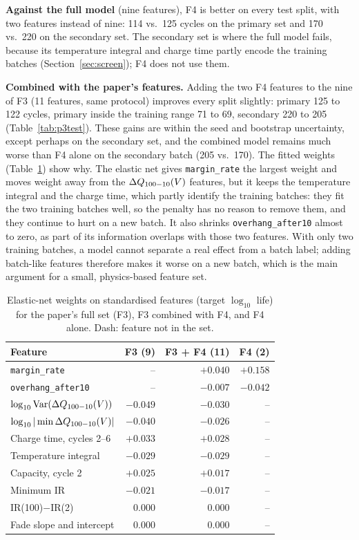 \textbf{Against the full model} (nine features), F4 is better on every test
split, with two features instead of nine: 114 vs.\ 125 cycles on the primary
set and 170 vs.\ 220 on the secondary set. The secondary set is where the
full model fails, because its temperature integral and charge time partly
encode the training batches (Section~\ref{sec:screen}); F4 does not use
them.

\textbf{Combined with the paper's features.} Adding the two F4 features to
the nine of F3 (11 features, same protocol) improves every split slightly:
primary 125 to 122 cycles, primary inside the training range 71 to 69,
secondary 220 to 205 (Table~\ref{tab:p3test}). These gains are within the
seed and bootstrap uncertainty, except perhaps on the secondary set, and the
combined model remains much worse than F4 alone on the secondary batch (205
vs.\ 170). The fitted weights (Table~\ref{tab:p3coef}) show why. The elastic
net gives \texttt{margin\_rate} the largest weight and moves weight away from
the $\Delta Q_{100-10}(V)$ features, but it keeps the temperature integral and the charge time,
which partly identify the training batches: they fit the two training batches
well, so the penalty has no reason to remove them, and they continue to hurt
on a new batch. It also shrinks \texttt{overhang\_after10} almost to zero, as
part of its information overlaps with those two features. With only two
training batches, a model cannot separate a real effect from a batch label;
adding batch-like features therefore makes it worse on a new batch, which is
the main argument for a small, physics-based feature set.

\begin{table}[t]
\centering
\caption{Elastic-net weights on standardised features (target
$\log_{10}$ life) for the paper's full set (F3), F3 combined with F4, and F4
alone. Dash: feature not in the set.}
\label{tab:p3coef}
\setlength{\tabcolsep}{4pt}
\begin{tabular}{@{}lrrr@{}}
\toprule
Feature & F3 (9) & F3 + F4 (11) & F4 (2) \\
\midrule
\texttt{margin\_rate} & -- & $+0.040$ & $+0.158$ \\
\texttt{overhang\_after10} & -- & $-0.007$ & $-0.042$ \\
$\log_{10}\mathrm{Var}(\Delta Q_{100-10}(V))$ & $-0.049$ & $-0.030$ & -- \\
$\log_{10}|\min\Delta Q_{100-10}(V)|$ & $-0.040$ & $-0.026$ & -- \\
Charge time, cycles 2--6 & $+0.033$ & $+0.028$ & -- \\
Temperature integral & $-0.029$ & $-0.029$ & -- \\
Capacity, cycle 2 & $+0.025$ & $+0.017$ & -- \\
Minimum IR & $-0.021$ & $-0.017$ & -- \\
IR(100)$-$IR(2) & $0.000$ & $0.000$ & -- \\
Fade slope and intercept & $0.000$ & $0.000$ & -- \\
\bottomrule
\end{tabular}
\end{table}

